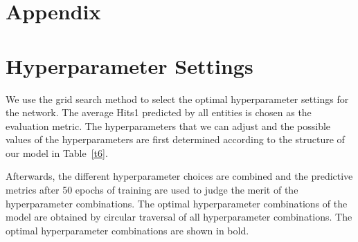 \documentclass[11pt]{article}
\begin{document}



\appendix

\newpage
\section*{Appendix} 

\section{Hyperparameter Settings}
\label{hyper}

We use the grid search method to select the optimal hyperparameter settings for the network. The average Hits1 predicted by all entities is chosen as the evaluation metric. The hyperparameters that we can adjust and the possible values of the hyperparameters are first determined according to the structure of our model in Table~\ref{t6}. 

Afterwards, the different hyperparameter choices are combined and the predictive metrics after 50 epochs of training are used to judge the merit of the hyperparameter combinations. The optimal hyperparameter combinations of the model are obtained by circular traversal of all hyperparameter combinations. The optimal hyperparameter combinations are shown in bold. 
\end{document}
